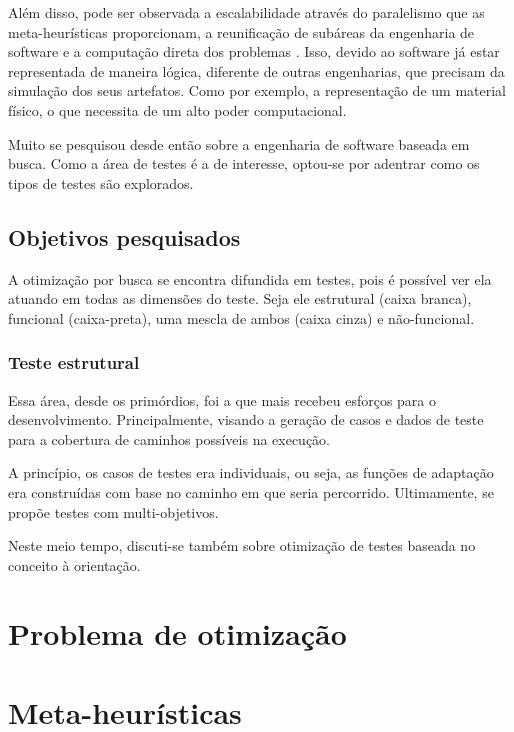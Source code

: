Além disso, pode ser observada a escalabilidade através do paralelismo que as
meta-heurísticas proporcionam, a reunificação de subáreas da engenharia de
software e a computação direta dos problemas \cite{harman2012search}. Isso,
devido ao software já estar representada de maneira lógica, diferente de outras
engenharias, que precisam da simulação dos seus artefatos. Como por exemplo, a
representação de um material físico, o que necessita de um alto poder
computacional.

Muito se pesquisou desde então sobre a engenharia de software baseada em busca.
Como a área de testes é a de interesse, optou-se por adentrar como os tipos de
testes são explorados.

\subsection{Objetivos pesquisados}

A otimização por busca se encontra difundida em testes, pois é possível ver ela
atuando em todas as dimensões do teste. Seja ele estrutural (caixa branca),
funcional (caixa-preta), uma mescla de ambos (caixa cinza) e não-funcional.

\subsubsection{Teste estrutural}

Essa área, desde os primórdios, foi a que mais recebeu esforços para o
desenvolvimento. Principalmente, visando a geração de casos e dados de teste
para a cobertura de caminhos possíveis na execução. 

A princípio, os casos de testes era individuais, ou seja, as funções de
adaptação era construídas com base no caminho em que seria percorrido.
Ultimamente, se propõe testes com multi-objetivos. 

Neste meio tempo, discuti-se também sobre otimização de testes baseada no
conceito à orientação. 

\section{Problema de otimização}

\section{Meta-heurísticas}

